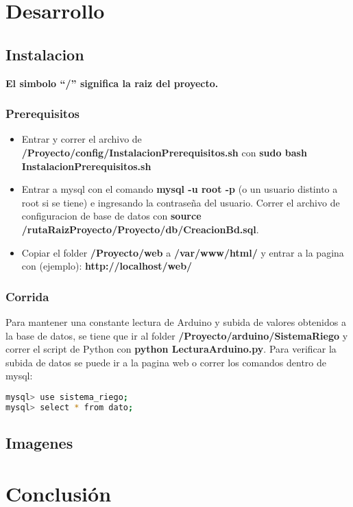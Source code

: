 \documentclass{article}
\begin{document}
\newpage
\section{Desarrollo}

\subsection{Instalacion}
\textbf{El simbolo ``/'' significa la raiz del proyecto.}

\subsubsection{Prerequisitos}

\begin{itemize}
	\item Entrar y correr el archivo de \textbf{/Proyecto/config/InstalacionPrerequisitos.sh} con \textbf{sudo bash InstalacionPrerequisitos.sh}
	\item Entrar a mysql con el comando \textbf{mysql -u root -p} (o un usuario distinto a root si se tiene) e ingresando la contrase\~na del usuario. Correr el archivo de configuracion de base de datos con \textbf{source /rutaRaizProyecto/Proyecto/db/CreacionBd.sql}.
	\item Copiar el folder \textbf{/Proyecto/web} a \textbf{/var/www/html/} y entrar a la pagina con (ejemplo): \textbf{http://localhost/web/}
\end{itemize}

\subsubsection{Corrida}
Para mantener una constante lectura de Arduino y subida de valores obtenidos a la base de datos, se tiene que ir al folder \textbf{/Proyecto/arduino/SistemaRiego} y correr el script de Python con \textbf{python LecturaArduino.py}.
\newline Para verificar la subida de datos se puede ir a la pagina web o correr los comandos dentro de mysql:
\begin{lstlisting}[language=bash]
mysql> use sistema_riego;
mysql> select * from dato;
\end{lstlisting}

\subsection{Imagenes}

\newpage
\section{Conclusión}
\end{document}

